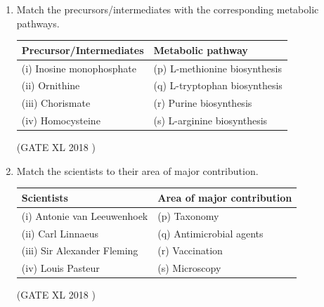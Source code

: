\documentclass[14pt]{extarticle}
\begin{document}
\begin{flushleft}
\begin{enumerate}
\item Match the precursors/intermediates with the corresponding metabolic pathways.  \\
\begin{tabular}{|l|l|}
\hline
\textbf{Precursor/Intermediates} & \textbf{Metabolic pathway} \\ \hline
(i) Inosine monophosphate & (p) L-methionine biosynthesis \\
(ii) Ornithine & (q) L-tryptophan biosynthesis \\
(iii) Chorismate & (r) Purine biosynthesis \\
(iv) Homocysteine & (s) L-arginine biosynthesis \\ \hline
\end{tabular}
\hfill(GATE XL 2018 )\\
\begin{enumerate}[label=(\Alph*)]
\end{enumerate}

\item Match the scientists to their area of major contribution.  
\begin{center}
\begin{tabular}{|l|l|}
\hline
\textbf{Scientists} & \textbf{Area of major contribution} \\ \hline
(i) Antonie van Leeuwenhoek & (p) Taxonomy \\ 
(ii) Carl Linnaeus & (q) Antimicrobial agents \\ 
(iii) Sir Alexander Fleming & (r) Vaccination \\ 
(iv) Louis Pasteur & (s) Microscopy \\ \hline
\end{tabular}
\end{center}
\hfill(GATE XL 2018 )\\
\begin{enumerate}[label=(\Alph*)]
\end{enumerate}


\end{enumerate}
\end{flushleft}
\end{document}
